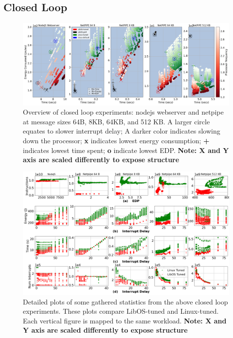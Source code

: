 \subsection{Closed Loop}
\label{sec:closed_loop}
\begin{figure}
\centering
\includegraphics[width=1\textwidth]{figures/closed_loop_overview.png}
\vspace*{-9mm}
\caption[]
{Overview of closed loop experiments: nodejs webserver and netpipe at message sizes 64B, 8KB, 64KB, and 512 KB.
A larger circle equates to slower interrupt delay;
A darker color indicates slowing down the processor;
\textbf{x} indicates lowest energy consumption;
\textbf{+} indicates lowest time spent;
\textbf{o} indicate lowest EDP.
\textbf{Note: X and Y axis are scaled differently to expose structure}}
\label{fig:closed_loop_overview}
\end{figure}
\begin{figure}
\centering
\includegraphics[width=1\textwidth]{figures/closed_detail_1.png}
\vspace*{-9mm}
\caption[]
{Detailed plots of some gathered statistics from the above closed loop experiments.
These plots compare LibOS-tuned and Linux-tuned. Each vertical figure is mapped to the same workload.
\textbf{Note: X and Y axis are scaled differently to expose structure}}
\label{fig:closed_loop_detail_1}
\end{figure}
